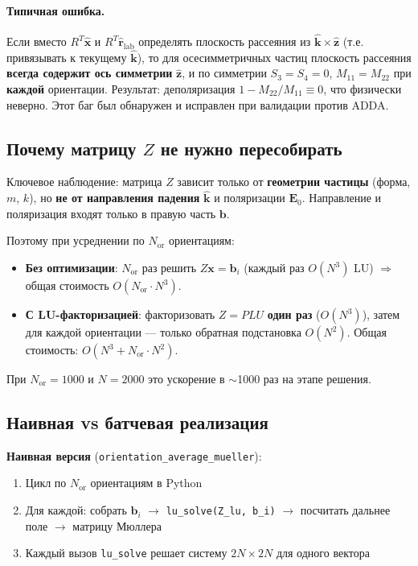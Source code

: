 \documentclass[12pt,a4paper]{article}
\begin{document}
\paragraph{Типичная ошибка.}
Если вместо $R^T \hat{\mathbf{x}}$ и $R^T \hat{\mathbf{r}}_{\mathrm{lab}}$ определять плоскость рассеяния из $\hat{\mathbf{k}} \times \hat{\mathbf{z}}$ (т.е. привязывать к текущему $\hat{\mathbf{k}}$), то для осесимметричных частиц плоскость рассеяния \textbf{всегда содержит ось симметрии} $\hat{\mathbf{z}}$, и по симметрии $S_3 = S_4 = 0$, $M_{11} = M_{22}$ при \textbf{каждой} ориентации. Результат: деполяризация $1 - M_{22}/M_{11} \equiv 0$, что физически неверно. Этот баг был обнаружен и исправлен при валидации против ADDA.

\subsection{Почему матрицу $Z$ не нужно пересобирать}

Ключевое наблюдение: матрица $Z$ зависит только от \textbf{геометрии частицы} (форма, $m$, $k$), но \textbf{не от направления падения} $\hat{\mathbf{k}}$ и поляризации $\mathbf{E}_0$. Направление и поляризация входят только в правую часть $\mathbf{b}$.

Поэтому при усреднении по $N_{\mathrm{or}}$ ориентациям:
\begin{itemize}
  \item \textbf{Без оптимизации}: $N_{\mathrm{or}}$ раз решить $Z \mathbf{x} = \mathbf{b}_i$ (каждый раз $O(N^3)$ LU) $\Rightarrow$ общая стоимость $O(N_{\mathrm{or}} \cdot N^3)$.
  \item \textbf{С LU-факторизацией}: факторизовать $Z = PLU$ \textbf{один раз} ($O(N^3)$), затем для каждой ориентации --- только обратная подстановка $O(N^2)$. Общая стоимость: $O(N^3 + N_{\mathrm{or}} \cdot N^2)$.
\end{itemize}

При $N_{\mathrm{or}} = 1000$ и $N = 2000$ это ускорение в $\sim$1000 раз на этапе решения.

\subsection{Наивная vs батчевая реализация}

\textbf{Наивная версия} (\texttt{orientation\_average\_mueller}):
\begin{enumerate}
  \item Цикл по $N_{\mathrm{or}}$ ориентациям в Python
  \item Для каждой: собрать $\mathbf{b}_i$ $\to$ \texttt{lu\_solve(Z\_lu, b\_i)} $\to$ посчитать дальнее поле $\to$ матрицу Мюллера
  \item Каждый вызов \texttt{lu\_solve} решает систему $2N \times 2N$ для одного вектора
\end{enumerate}
\end{document}
